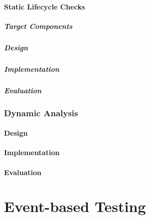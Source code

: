 \documentclass[11pt,a4paper,notitlepage]{article}
\begin{document}
\subsection{Static Lifecycle Checks}

\subsubsection{Target Components}

\subsubsection{Design}

\subsubsection{Implementation}

\subsubsection{Evaluation}



\section{Dynamic Analysis}

\subsection{Design}

\subsection{Implementation}

\subsection{Evaluation}


\part{Event-based Testing}
\end{document}
